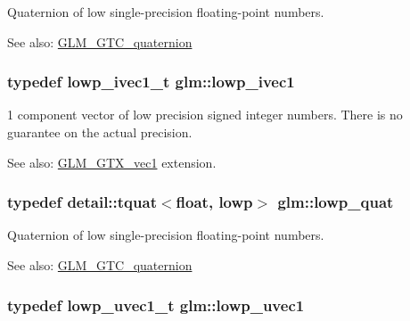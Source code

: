 Quaternion of low single-precision floating-point numbers.

\begin{Desc}
\item[See also:]\hyperlink{group__gtc__quaternion}{GLM\_\-GTC\_\-quaternion} \end{Desc}
\hypertarget{namespaceglm_5d781b915bec50a9d5b5383835035533}{
\subsubsection[lowp\_\-ivec1]{\setlength{\rightskip}{0pt plus 5cm}typedef lowp\_\-ivec1\_\-t {\bf glm::lowp\_\-ivec1}}}
\label{namespaceglm_5d781b915bec50a9d5b5383835035533}


1 component vector of low precision signed integer numbers. There is no guarantee on the actual precision. \begin{Desc}
\item[See also:]\hyperlink{group__gtx__vec1}{GLM\_\-GTX\_\-vec1} extension. \end{Desc}
\hypertarget{namespaceglm_efc1d896fa40939955d68b2c68c33cc8}{
\subsubsection[lowp\_\-quat]{\setlength{\rightskip}{0pt plus 5cm}typedef detail::tquat$<$float, lowp$>$ {\bf glm::lowp\_\-quat}}}
\label{namespaceglm_efc1d896fa40939955d68b2c68c33cc8}


Quaternion of low single-precision floating-point numbers.

\begin{Desc}
\item[See also:]\hyperlink{group__gtc__quaternion}{GLM\_\-GTC\_\-quaternion} \end{Desc}
\hypertarget{namespaceglm_d50d8a6d477675ffc627f0949f1d5615}{
\subsubsection[lowp\_\-uvec1]{\setlength{\rightskip}{0pt plus 5cm}typedef lowp\_\-uvec1\_\-t {\bf glm::lowp\_\-uvec1}}}
\label{namespaceglm_d50d8a6d477675ffc627f0949f1d5615}


